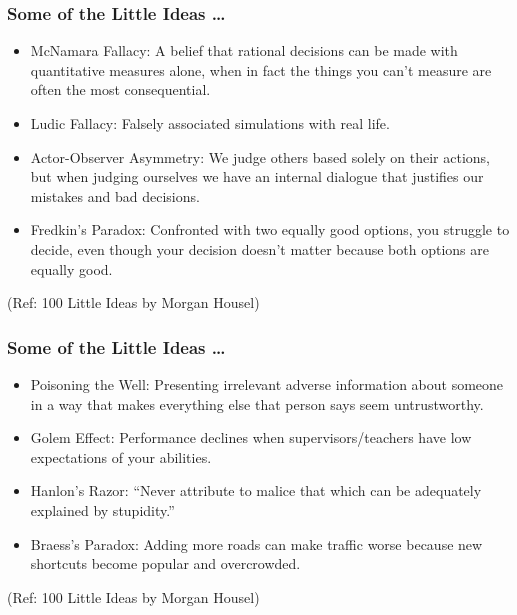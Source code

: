 \begin{frame}[fragile]\frametitle{ Some of the Little Ideas \ldots}

	\begin{itemize}
	\item McNamara Fallacy: A belief that rational decisions can be made with quantitative measures alone, when in fact the things you can’t measure are often the most consequential. 
	\item Ludic Fallacy: Falsely associated simulations with real life.
	\item Actor-Observer Asymmetry: We judge others based solely on their actions, but when judging ourselves we have an internal dialogue that justifies our mistakes and bad decisions.
	\item Fredkin’s Paradox: Confronted with two equally good options, you struggle to decide, even though your decision doesn’t matter because both options are equally good. 
	\end{itemize}

{\tiny (Ref: 100 Little Ideas by Morgan Housel)}

\end{frame}

\begin{frame}[fragile]\frametitle{ Some of the Little Ideas \ldots}

	\begin{itemize}
	\item Poisoning the Well: Presenting irrelevant adverse information about someone in a way that makes everything else that person says seem untrustworthy.
	\item Golem Effect: Performance declines when supervisors/teachers have low expectations of your abilities.
	\item Hanlon’s Razor: “Never attribute to malice that which can be adequately explained by stupidity.”
	\item Braess’s Paradox: Adding more roads can make traffic worse because new shortcuts become popular and overcrowded.
	\end{itemize}

{\tiny (Ref: 100 Little Ideas by Morgan Housel)}

\end{frame}

